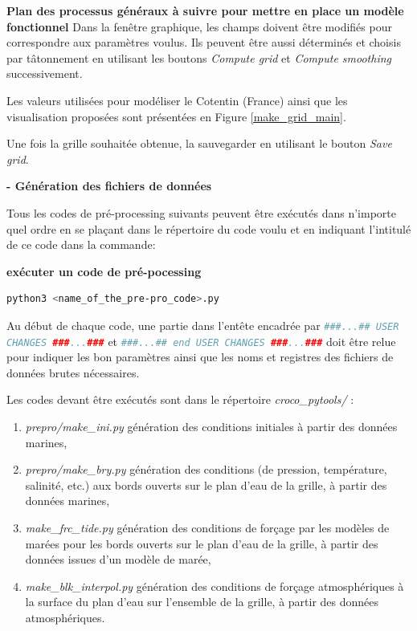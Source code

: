 \documentclass[10pt,a4paper,titlepage]{article}
\begin{document}
\begin{processEnv}{\textbf{Plan des processus généraux à suivre pour mettre en place un modèle fonctionnel}}
        Dans la fenêtre graphique, les champs doivent être modifiés pour correspondre aux paramètres voulus. Ils peuvent être aussi déterminés et choisis par tâtonnement en utilisant les boutons \textit{Compute grid} et \textit{Compute smoothing} successivement.
        
        Les valeurs utilisées pour modéliser le Cotentin (France) ainsi que les visualisation proposées sont présentées en Figure \ref{make_grid_main}.
        
        Une fois la grille souhaitée obtenue, la sauvegarder en utilisant le bouton \textit{Save grid}.
        
        \textbf{- Génération des fichiers de données}
        
        Tous les codes de pré-processing suivants peuvent être exécutés dans n'importe quel ordre en se plaçant dans le répertoire du code voulu et en indiquant l'intitulé de ce code dans la commande:
        
        \begin{codeEnv}{\textbf{exécuter un code de pré-pocessing}}
            \begin{lstlisting}[language=bash]
                python3 <name_of_the_pre-pro_code>.py
            \end{lstlisting}
        \end{codeEnv}
        
        Au début de chaque code, une partie dans l'entête encadrée par \lstinline[language=python]|###...## USER CHANGES ###...###| et \lstinline[language=python]|###...## end USER CHANGES ###...###| doit être relue pour indiquer les bon paramètres ainsi que les noms et registres des fichiers de données brutes nécessaires.
        
        Les codes devant être exécutés sont dans le répertoire \textit{croco\_pytools/} :
        
        \begin{enumerate}
            \item \textit{prepro/make\_ini.py} génération des conditions initiales à partir des données marines,
            \item \textit{prepro/make\_bry.py} génération des conditions (de pression, température, salinité, etc.) aux bords ouverts sur le plan d'eau de la grille, à partir des données marines,
            \item \textit{make\_frc\_tide.py} génération des conditions de forçage par les modèles de marées pour les bords ouverts sur le plan d'eau de la grille, à partir des données issues d'un modèle de marée,
            \item \textit{make\_blk\_interpol.py} génération des conditions de forçage atmosphériques à la surface du plan d'eau sur l'ensemble de la grille, à partir des données atmosphériques.
        \end{enumerate}
        

\end{processEnv}
\end{document}
